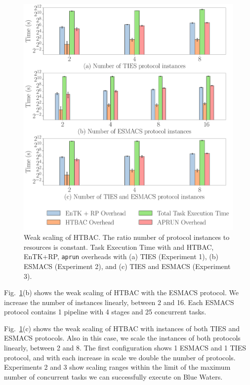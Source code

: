 \begin{figure}
  \centering
    \includegraphics[width=\columnwidth]{figures/ws_all_base2.pdf}
    \caption{Weak scaling of HTBAC. The ratio number of protocol
    instances to resources is constant. Task Execution Time with and HTBAC,
    EnTK+RP, \texttt{aprun} overheads with (a) TIES (Experiment 1), (b)
    ESMACS (Experiment 2), and (c) TIES and ESMACS (Experiment
    3).}\label{fig:ws}
\up{}
\up{}
\up{}
\end{figure}

Fig.~\ref{fig:ws}(b) shows the weak scaling of HTBAC with the ESMACS
protocol. We increase the number of instances linearly, between 2 and 16.
Each ESMACS protocol contains 1 pipeline with 4 stages and 25 concurrent
tasks.

Fig.~\ref{fig:ws}(c) shows the weak scaling of HTBAC with instances of
both TIES and ESMACS protocols. Also in this case, we scale the instances of
both protocols linearly, between 2 and 8. The first configuration shows 1
ESMACS and 1 TIES protocol, and with each increase in scale we double the
number of protocols. Experiments 2 and 3 show scaling ranges within the
limit of the maximum number of concurrent tasks we can successfully execute
on Blue Waters. 

